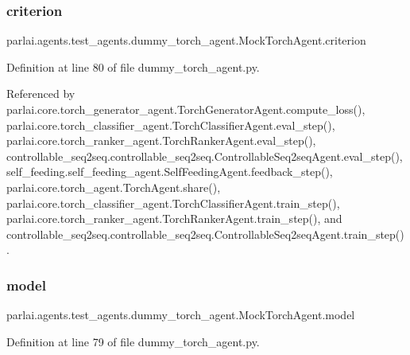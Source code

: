 \subsubsection{\texorpdfstring{criterion}{criterion}}
{\footnotesize\ttfamily parlai.\+agents.\+test\+\_\+agents.\+dummy\+\_\+torch\+\_\+agent.\+Mock\+Torch\+Agent.\+criterion}



Definition at line 80 of file dummy\+\_\+torch\+\_\+agent.\+py.



Referenced by parlai.\+core.\+torch\+\_\+generator\+\_\+agent.\+Torch\+Generator\+Agent.\+compute\+\_\+loss(), parlai.\+core.\+torch\+\_\+classifier\+\_\+agent.\+Torch\+Classifier\+Agent.\+eval\+\_\+step(), parlai.\+core.\+torch\+\_\+ranker\+\_\+agent.\+Torch\+Ranker\+Agent.\+eval\+\_\+step(), controllable\+\_\+seq2seq.\+controllable\+\_\+seq2seq.\+Controllable\+Seq2seq\+Agent.\+eval\+\_\+step(), self\+\_\+feeding.\+self\+\_\+feeding\+\_\+agent.\+Self\+Feeding\+Agent.\+feedback\+\_\+step(), parlai.\+core.\+torch\+\_\+agent.\+Torch\+Agent.\+share(), parlai.\+core.\+torch\+\_\+classifier\+\_\+agent.\+Torch\+Classifier\+Agent.\+train\+\_\+step(), parlai.\+core.\+torch\+\_\+ranker\+\_\+agent.\+Torch\+Ranker\+Agent.\+train\+\_\+step(), and controllable\+\_\+seq2seq.\+controllable\+\_\+seq2seq.\+Controllable\+Seq2seq\+Agent.\+train\+\_\+step().

\mbox{\label{classparlai_1_1agents_1_1test__agents_1_1dummy__torch__agent_1_1MockTorchAgent_afebdb752bdbb212a078b4bdee5d9f45f}} 
\subsubsection{\texorpdfstring{model}{model}}
{\footnotesize\ttfamily parlai.\+agents.\+test\+\_\+agents.\+dummy\+\_\+torch\+\_\+agent.\+Mock\+Torch\+Agent.\+model}



Definition at line 79 of file dummy\+\_\+torch\+\_\+agent.\+py.



